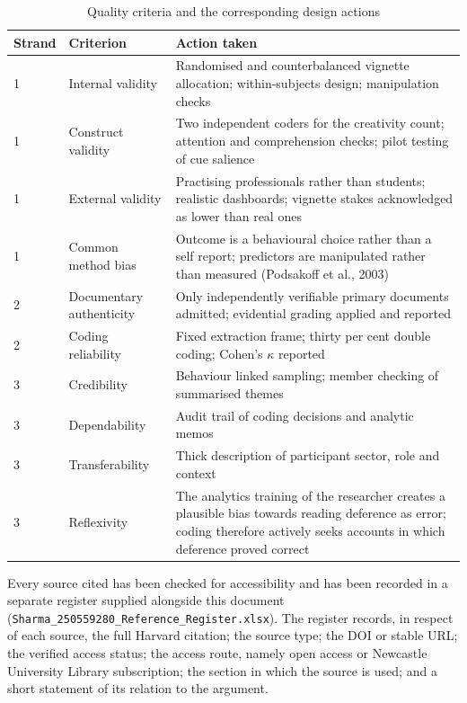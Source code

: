 \documentclass[12pt,a4paper]{article}
\begin{document}
\begin{table}[H]
\centering\footnotesize
\caption{Quality criteria and the corresponding design actions}
\label{tab:quality}
\begin{tabularx}{\textwidth}{@{}p{1.6cm} p{3.0cm} X@{}}
\toprule
\textbf{Strand} & \textbf{Criterion} & \textbf{Action taken} \\
\midrule
1 & Internal validity & Randomised and counterbalanced vignette allocation; within-subjects design;
manipulation checks \\
1 & Construct validity & Two independent coders for the creativity count; attention and comprehension
checks; pilot testing of cue salience \\
1 & External validity & Practising professionals rather than students; realistic dashboards; vignette
stakes acknowledged as lower than real ones \\
1 & Common method bias & Outcome is a behavioural choice rather than a self report; predictors are
manipulated rather than measured (Podsakoff et al., 2003) \\
2 & Documentary authenticity & Only independently verifiable primary documents admitted; evidential grading
applied and reported \\
2 & Coding reliability & Fixed extraction frame; thirty per cent double coding; Cohen's $\kappa$ reported \\
3 & Credibility & Behaviour linked sampling; member checking of summarised themes \\
3 & Dependability & Audit trail of coding decisions and analytic memos \\
3 & Transferability & Thick description of participant sector, role and context \\
3 & Reflexivity & The analytics training of the researcher creates a plausible bias towards reading
deference as error; coding therefore actively seeks accounts in which deference proved correct \\
\bottomrule
\end{tabularx}
\end{table}

\newpage
{}

Every source cited has been checked for accessibility and has been recorded in a separate register
supplied alongside this document (\texttt{Sharma\_250559280\_Reference\_Register.xlsx}). The register records, in
respect of each source, the full Harvard citation; the source type; the DOI or stable URL; the verified
access status; the access route, namely open access or Newcastle University Library subscription; the
section in which the source is used; and a short statement of its relation to the argument.
\end{document}
